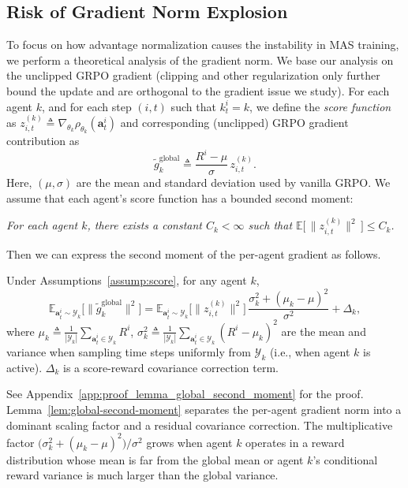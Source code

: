 \subsection{Risk of Gradient Norm Explosion}
\label{sec:risk}
To focus on how advantage normalization causes the instability in MAS training, we perform a theoretical analysis of the gradient norm. We base our analysis on the unclipped GRPO gradient (clipping and other regularization only further bound the update and are orthogonal to the gradient issue we study).
For each agent $k$, and for each step $(i,t)$ such that $k_t^i = k$, we define
the \emph{score function} as $z_{i,t}^{(k)} \triangleq \nabla_{\theta_k} \rho_{\theta_k}(\bm{a}_t^{i})$ and corresponding (unclipped) GRPO gradient contribution as
\begin{equation}
    \tilde{g}_k^{\mathrm{global}}
    \triangleq
    \frac{R^i - \mu}{\sigma}\,
    z_{i,t}^{(k)}.
\end{equation}
Here, $(\mu,\sigma)$ are the mean and standard deviation used by vanilla GRPO. We assume that each agent’s score function has a bounded second moment:
\begin{assumption}
\label{assump:score}
\emph{For each agent $k$, there exists a constant $C_k < \infty$ such that $\mathbb{E}\big[\,\|z_{i,t}^{(k)}\|^2\,\big] \le C_k$.}
\end{assumption}
Then we can express the second moment of the per-agent gradient as follows.
\begin{lemma}
\label{lem:global-second-moment}
Under Assumptions~\ref{assump:score}, for any agent $k$,
\begin{equation}
\nonumber
\mathbb{E}_{\bm{a}_t^i\sim \mathcal{Y}_k}\big[\|\tilde{g}_k^{\mathrm{global}}\|^2\big]
{=} \mathbb{E}_{\bm{a}_t^i\sim \mathcal{Y}_k}\big[\|z_{i,t}^{(k)}\|^2\big]\,
  \frac{\sigma_k^2 + (\mu_k - \mu)^2}{\sigma^2} + \Delta_k,
\end{equation}
where $\mu_k \triangleq \frac{1}{|\mathcal{Y}_k|}\sum_{\bm{a}_t^i\in \mathcal{Y}_k} R^i$, $\sigma_k^2 \triangleq \frac{1}{|\mathcal{Y}_k|}\sum_{\bm{a}_t^i\in \mathcal{Y}_k} (R^i - \mu_k)^2$
are the mean and variance when sampling
time steps uniformly from $\mathcal{Y}_k$ (i.e., when agent $k$ is active). $\Delta_k$ is a score-reward covariance correction term.
\end{lemma}
See Appendix~\ref{app:proof_lemma_global_second_moment} for the proof.
Lemma~\ref{lem:global-second-moment} separates the per-agent gradient norm into a dominant scaling factor and a residual covariance correction. The multiplicative factor $\bigl(\sigma_k^2+(\mu_k-\mu)^2\bigr)/\sigma^2$ grows when agent $k$ operates in a reward distribution whose mean is far from the global mean or agent $k$’s conditional reward variance is much larger than the global variance.

